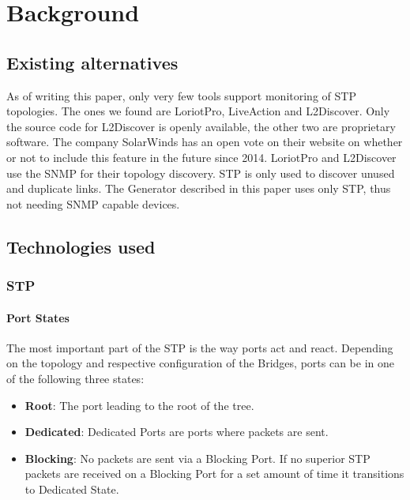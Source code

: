 \chapter{Background}
\section{Existing alternatives}
As of writing this paper, only very few tools support monitoring of STP topologies.
The ones we found are LoriotPro\cite{LoriotPro}, LiveAction\cite{LiveAction} and L2Discover\cite{L2Discover}.
Only the source code for L2Discover is openly available, the other two are proprietary software.
The company SolarWinds has an open vote on their website on whether or not to include this feature in the future since 2014\cite{thwackSW}.
LoriotPro and L2Discover use the SNMP for their topology discovery.
STP is only used to discover unused and duplicate links.
The Generator described in this paper uses only STP, thus not needing SNMP capable devices.

\section{Technologies used}
\subsection{STP}
\subsubsection{Port States}
The most important part of the STP is the way ports act and react.
Depending on the topology and respective configuration of the Bridges, ports can be in one of the following three states:
\begin{itemize}
    \item \textbf{Root}: The port leading to the root of the tree.
    \item \textbf{Dedicated}: Dedicated Ports are ports where packets are sent.
    \item \textbf{Blocking}: No packets are sent via a Blocking Port.
        If no superior STP packets are received on a Blocking Port for a set amount of time it transitions to Dedicated State.
\end{itemize}
